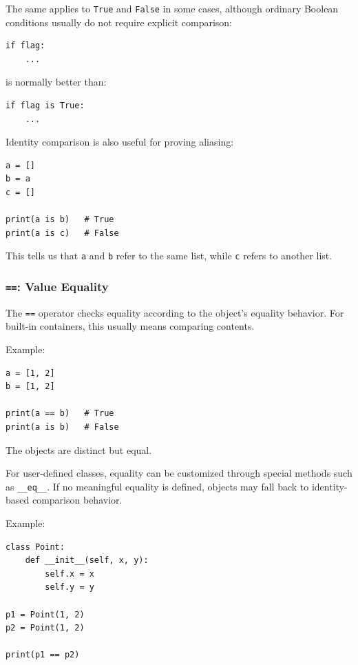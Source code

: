 The same applies to \texttt{True} and \texttt{False} in some cases, although ordinary Boolean conditions usually do not require explicit comparison:

\begin{verbatim}
if flag:
    ...
\end{verbatim}

is normally better than:

\begin{verbatim}
if flag is True:
    ...
\end{verbatim}

Identity comparison is also useful for proving aliasing:

\begin{verbatim}
a = []
b = a
c = []

print(a is b)   # True
print(a is c)   # False
\end{verbatim}

This tells us that \texttt{a} and \texttt{b} refer to the same list, while \texttt{c} refers to another list.

\subsubsection*{\texttt{==}: Value Equality}

The \texttt{==} operator checks equality according to the object's equality behavior. For built-in containers, this usually means comparing contents.

Example:

\begin{verbatim}
a = [1, 2]
b = [1, 2]

print(a == b)   # True
print(a is b)   # False
\end{verbatim}

The objects are distinct but equal.

For user-defined classes, equality can be customized through special methods such as \texttt{\_\_eq\_\_}. If no meaningful equality is defined, objects may fall back to identity-based comparison behavior.

Example:

\begin{verbatim}
class Point:
    def __init__(self, x, y):
        self.x = x
        self.y = y

p1 = Point(1, 2)
p2 = Point(1, 2)

print(p1 == p2)
\end{verbatim}

